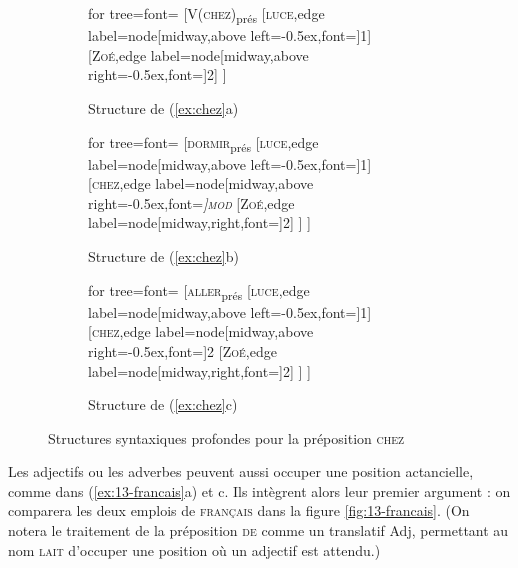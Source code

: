 \begin{figure}
	\begin{subfigure}[b]{0.3\textwidth}
		\centering
		\begin{forest} for tree={font=\normalfont}
			[V(\textsc{chez})\textsubscript{prés}
			[\textsc{luce},edge label={node[midway,above left=-0.5ex,font=\footnotesize]{1}}]
			[\textsc{Zoé},edge label={node[midway,above right=-0.5ex,font=\footnotesize]{2}}]
			]
		\end{forest}
		\caption{Structure de (\ref{ex:chez}a)}
	\end{subfigure}%
	\hfill
	\begin{subfigure}[b]{0.3\textwidth}
		\centering
		\begin{forest} for tree={font=\normalfont}
			[\textsc{dormir}\textsubscript{prés}
			[\textsc{luce},edge label={node[midway,above left=-0.5ex,font=\footnotesize]{1}}]
			[\textsc{chez},edge label={node[midway,above right=-0.5ex,font=\footnotesize\itshape]{\textsc{mod}}}
			[\textsc{Zoé},edge label={node[midway,right,font=\footnotesize]{2}}]
			]
			]
		\end{forest}
		\caption{Structure de (\ref{ex:chez}b)}
	\end{subfigure}%
	\hfill
	\begin{subfigure}[b]{0.3\textwidth}
		\centering
		\begin{forest} for tree={font=\normalfont}
			[\textsc{aller}\textsubscript{prés}
			[\textsc{luce},edge label={node[midway,above left=-0.5ex,font=\footnotesize]{1}}]
			[\textsc{chez},edge label={node[midway,above right=-0.5ex,font=\footnotesize]{2}}
			[\textsc{Zoé},edge label={node[midway,right,font=\footnotesize]{2}}]
			]
			]
		\end{forest}
		\caption{Structure de (\ref{ex:chez}c)}
	\end{subfigure}
\caption{Structures syntaxiques profondes pour la préposition \textsc{chez}\label{fig:chez}}
\end{figure}

Les adjectifs ou les adverbes peuvent aussi occuper une position actancielle, comme dans (\ref{ex:13-francais}a) et c. Ils intègrent alors leur premier argument : on comparera les deux emplois de \textsc{français} dans la figure \ref{fig:13-francais}. (On notera le traitement de la préposition \textsc{de} comme un translatif Adj, permettant au nom \textsc{lait} d'occuper une position où un adjectif est attendu.)


